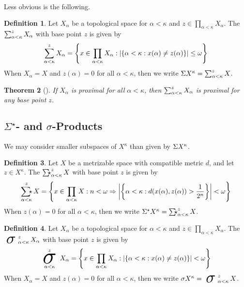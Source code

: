 \documentclass{amsart}
\newtheorem{theorem}{Theorem}[section]
\theoremstyle{definition}
\newtheorem{definition}[theorem]{Definition}
\begin{document}
  Less obvious is the following.

  \begin{definition}
    Let \(X_\alpha\) be a topological space for \(\alpha<\kappa\)
    and \(z\in\prod_{\alpha<\kappa}X_\alpha\).
    The  \(\sum_{\alpha<\kappa}^{z}X_\alpha\)
    with base point \(z\) is given by
    \[
      \sum_{\alpha<\kappa}^{z}X_\alpha
        =
      \left\{
        x\in \prod_{\alpha<\kappa}X_\alpha
      :
        |\{\alpha<\kappa:x(\alpha)\not=z(\alpha)\}|\leq\omega
      \right\}
    \]
    When \(X_\alpha=X\) and \(z(\alpha)=0\) for all \(\alpha<\kappa\),
    then we write \({\Sigma X^\kappa}=\sum_{\alpha<\kappa}^z X\).
  \end{definition}

  \begin{theorem}[\cite{MR3239205}]
    If \(X_\alpha\) is proximal for all \(\alpha<\kappa\),
    then \(\sum_{\alpha<\kappa}^{z}X_\alpha\) is proximal for any
    base point \(z\).
  \end{theorem}

\subsection{\(\Sigma^\star\)- and \(\sigma\)-Products}

  We may consider smaller subspaces of
  \(X^\kappa\) than given by \({\Sigma X^\kappa}\).

  \begin{definition}
    Let \(X\) be a metrizable space with
    compatible metric \(d\), and let \(z\in X^\kappa\).
    The 
    \(\SigmaStarProd_{\alpha<\kappa}^{z}X\)
    with base point \(z\) is given by
    \[
      \SigmaStarProd_{\alpha<\kappa}^{z}X
        =
      \left\{
        x\in \prod_{\alpha<\kappa}X
      :
        n<\omega
      \Rightarrow
        \left|\left\{
          \alpha<\kappa:d(x(\alpha),z(\alpha))>\frac{1}{2^n}
        \right\}\right|
        <\omega
      \right\}
    \]
    When \(z(\alpha)=0\) for all \(\alpha<\kappa\),
    then we write
    \(\SigmaStarPower{X}{\kappa}=\SigmaStarProd_{\alpha<\kappa}^z X\).
  \end{definition}

  \begin{definition}
    Let \(X_\alpha\) be a topological space for \(\alpha<\kappa\)
    and \(z\in\prod_{\alpha<\kappa}X_\alpha\).
    The  \(\sigmaProd_{\alpha<\kappa}^{z}X_\alpha\)
    with base point \(z\) is given by
    \[
      \sigmaProd_{\alpha<\kappa}^{z}X_\alpha
        =
      \left\{
        x\in \prod_{\alpha<\kappa}X_\alpha
      :
        |\{\alpha<\kappa:x(\alpha)\not=z(\alpha)\}|<\omega
      \right\}
    \]
    When \(X_\alpha=X\) and \(z(\alpha)=0\) for all \(\alpha<\kappa\),
    then we write \(\sigmaPower{X}{\kappa}=\sigmaProd_{\alpha<\kappa}^z X\).
  \end{definition}
\end{document}
